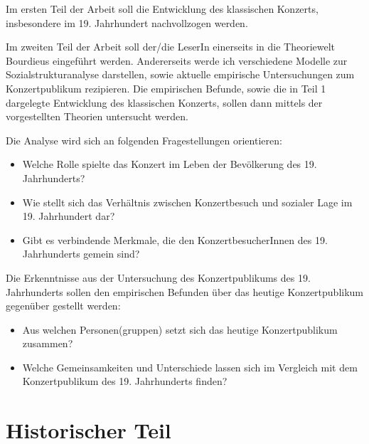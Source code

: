 \documentclass[a4paper, german, oneside]{scrbook}
\begin{document}
Im ersten Teil der Arbeit soll die Entwicklung des klassischen Konzerts, insbesondere im 19. Jahrhundert nachvollzogen werden. 

Im zweiten Teil der Arbeit soll der/die LeserIn einerseits in die Theoriewelt Bourdieus eingeführt werden. Andererseits werde ich verschiedene Modelle zur Sozialstrukturanalyse darstellen, sowie aktuelle empirische Untersuchungen zum Konzertpublikum rezipieren. Die empirischen Befunde, sowie die in Teil 1 dargelegte Entwicklung des klassischen Konzerts, sollen dann mittels der vorgestellten Theorien untersucht werden. 

Die Analyse wird sich an folgenden Fragestellungen orientieren:

\begin{itemize}
	\item Welche Rolle spielte das Konzert im Leben der Bevölkerung des 19. Jahrhunderts? %
	\item Wie stellt sich das Verhältnis zwischen Konzertbesuch und sozialer Lage im 19. Jahrhundert dar?
	\item Gibt es verbindende Merkmale, die den KonzertbesucherInnen des 19. Jahrhunderts gemein sind?
\end{itemize}

Die Erkenntnisse aus der Untersuchung des Konzertpublikums des 19. Jahrhunderts sollen den empirischen Befunden über das heutige Konzertpublikum gegenüber gestellt werden:

\begin{itemize}
	\item Aus welchen Personen(gruppen) setzt sich das heutige Konzertpublikum zusammen?
	\item Welche Gemeinsamkeiten und Unterschiede lassen sich im Vergleich mit dem Konzertpublikum des 19. Jahrhunderts finden?
\end{itemize}



\part{Historischer Teil}
\end{document}
